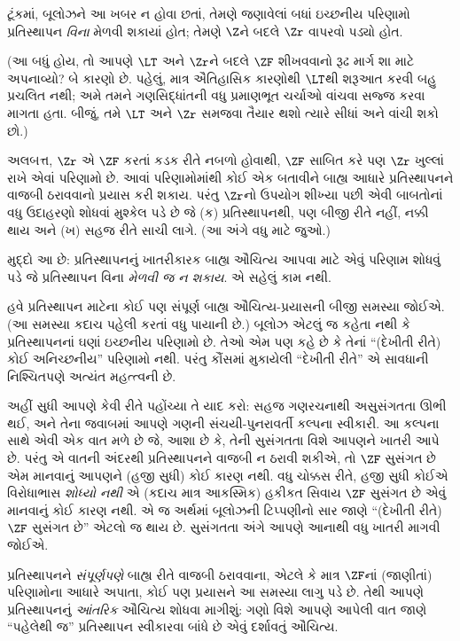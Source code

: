\documentclass[../../../include/open-logic-section]{subfiles}
\begin{document}
ટૂંકમાં, બૂલોઝને આ ખબર ન હોવા છતાં, તેમણે જણાવેલાં
બધાં ઇચ્છનીય પરિણામો પ્રતિસ્થાપન \emph{વિના} મેળવી
શકાયાં હોત; તેમણે $\Z$ને બદલે $\Zr$ વાપરવો પડ્યો હોત.

(આ બધું હોય, તો આપણે $\LT$ અને $\Zr$ને બદલે
$\ZF$ શીખવવાનો રૂઢ માર્ગ શા માટે અપનાવ્યો? બે કારણો છે.
પહેલું, માત્ર ઐતિહાસિક કારણોથી $\LT$થી શરૂઆત કરવી
બહુ પ્રચલિત નથી; અમે તમને ગણસિદ્ધાંતની વધુ પ્રમાણભૂત
ચર્ચાઓ વાંચવા સજ્જ કરવા માગતા હતા. બીજું, તમે $\LT$
અને $\Zr$ સમજવા તૈયાર થશો ત્યારે સીધાં \citealt{Potter2004}
અને \citealt{ButtonLT1} વાંચી શકો છો.)

અલબત્ત, $\Zr$ એ $\ZF$ કરતાં કડક રીતે નબળો હોવાથી,
$\ZF$ સાબિત કરે પણ $\Zr$ ખુલ્લાં રાખે એવાં પરિણામો છે.
આવાં પરિણામોમાંથી કોઈ એક બતાવીને બાહ્ય આધારે
પ્રતિસ્થાપનને વાજબી ઠરાવવાનો પ્રયાસ કરી શકાય. પરંતુ
$\Zr$નો ઉપયોગ શીખ્યા પછી એવી બાબતોનાં વધુ ઉદાહરણો
શોધવાં મુશ્કેલ પડે છે જે (ક) પ્રતિસ્થાપનથી, પણ બીજી
રીતે નહીં, નક્કી થાય અને (ખ) સહજ રીતે સાચી લાગે.
(આ અંગે વધુ માટે \citealt[\S13.2]{Potter2004} જુઓ.)

મુદ્દો આ છે: પ્રતિસ્થાપનનું ખાતરીકારક બાહ્ય ઔચિત્ય
આપવા માટે એવું પરિણામ શોધવું પડે જે પ્રતિસ્થાપન વિના
\emph{મેળવી જ ન શકાય}. એ સહેલું કામ નથી.

હવે પ્રતિસ્થાપન માટેના કોઈ પણ સંપૂર્ણ બાહ્ય ઔચિત્ય-પ્રયાસની
બીજી સમસ્યા જોઈએ. (આ સમસ્યા કદાચ પહેલી કરતાં વધુ પાયાની
છે.) બૂલોઝ એટલું જ કહેતા નથી કે પ્રતિસ્થાપનનાં ઘણાં
ઇચ્છનીય પરિણામો છે. તેઓ એમ પણ કહે છે કે તેનાં
``(દેખીતી રીતે) કોઈ અનિચ્છનીય'' પરિણામો નથી. પરંતુ
કૌંસમાં મુકાયેલી ``દેખીતી રીતે'' એ સાવધાની નિશ્ચિતપણે
અત્યંત મહત્ત્વની છે.

અહીં સુધી આપણે કેવી રીતે પહોંચ્યા તે યાદ કરો: સહજ
ગણરચનાથી અસુસંગતતા ઊભી થઈ, અને તેના જવાબમાં આપણે
ગણની સંચયી-પુનરાવર્તી કલ્પના સ્વીકારી. આ કલ્પના સાથે
એવી એક વાત મળે છે જે, આશા છે કે, તેની સુસંગતતા વિશે
આપણને ખાતરી આપે છે. પરંતુ એ વાતની અંદરથી પ્રતિસ્થાપનને
વાજબી ન ઠરાવી શકીએ, તો $\ZF$ સુસંગત છે એમ માનવાનું
આપણને (હજી સુધી) કોઈ કારણ નથી. વધુ ચોક્કસ રીતે,
હજી સુધી કોઈએ વિરોધાભાસ \emph{શોધ્યો નથી} એ
(કદાચ માત્ર આકસ્મિક) હકીકત સિવાય $\ZF$ સુસંગત છે
એવું માનવાનું કોઈ
કારણ નથી. એ જ અર્થમાં બૂલોઝની ટિપ્પણીનો સાર જાણે
``(દેખીતી રીતે) $\ZF$ સુસંગત છે'' એટલો જ થાય છે.
સુસંગતતા અંગે આપણે આનાથી વધુ ખાતરી માગવી જોઈએ.

પ્રતિસ્થાપનને \emph{સંપૂર્ણપણે} બાહ્ય રીતે વાજબી
ઠરાવવાના, એટલે કે માત્ર $\ZF$નાં (જાણીતાં) પરિણામોના
આધારે અપાતા, કોઈ પણ પ્રયાસને આ સમસ્યા લાગુ પડે છે.
તેથી આપણે પ્રતિસ્થાપનનું \emph{આંતરિક} ઔચિત્ય શોધવા
માગીશું: ગણો વિશે આપણે આપેલી વાત જાણે ``પહેલેથી જ''
પ્રતિસ્થાપન સ્વીકારવા બાંધે છે એવું દર્શાવતું ઔચિત્ય.
\end{document}
